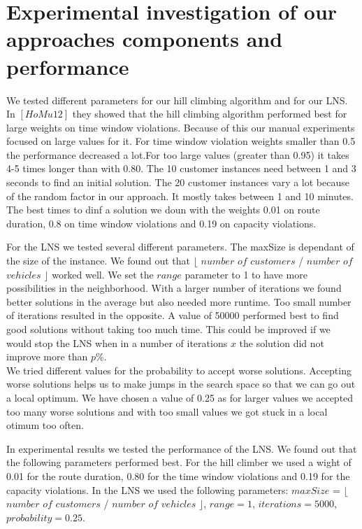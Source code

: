 \documentclass[fleqn]{scrartcl}
\begin{document}
\newpage
\section{Experimental investigation of our approaches components and performance}


We tested different parameters for our hill climbing algorithm and for our LNS. In $[HoMu 12]$ they showed that the hill climbing algorithm performed best for large weights on time window violations. Because of this our manual experiments focused on large values for it. For time window violation weights smaller than 0.5 the performance decreased a lot.For too large values (greater than 0.95) it takes 4-5 times longer than with 0.80. The 10 customer instances need between 1 and 3 seconds to find an initial solution. The 20 customer instances vary a lot because of the random factor in our approach. It mostly takes between 1 and 10 minutes. The best times to dinf a solution we doun with the weights 0.01 on route duration, 0.8 on time window violations and 0.19 on capacity violations.

For the LNS we tested several different parameters. The maxSize is dependant of the size of the instance. We found out that $\lfloor$ $number$ $of$ $customers$ / $number$ $of$ $vehicles$ $\rfloor$ worked well. We set the $range$ parameter to 1 to have more possibilities in the neighborhood. With a larger number of iterations we found better solutions in the average but also needed more runtime. Too small number of iterations resulted in the opposite. A value of 50000 performed best to find good solutions without taking too much time. This could be improved if we would stop the LNS when in a number of iterations $x$ the solution did not improve more than $p$\%. \\
We tried different values for the probability to accept worse solutions. Accepting worse solutions helps us to make jumps in the search space so that we can go out a local optimum. We have chosen a value of 0.25 as for larger values we accepted too many worse solutions and with too small values we got stuck in a local otimum too often.


In experimental results we tested the performance of the LNS. We found out that the following parameters performed best. For the hill climber we used a wight of 0.01 for the route duration, 0.80 for the time window violations and 0.19 for the capacity violations. In the LNS we used the following parameters: $maxSize$ = $\lfloor$ $number$ $of$ $customers$ / $number$ $of$ $vehicles$ $\rfloor$, $range = 1$, $iterations = 5000$, $probability = 0.25$. \\
\end{document}
